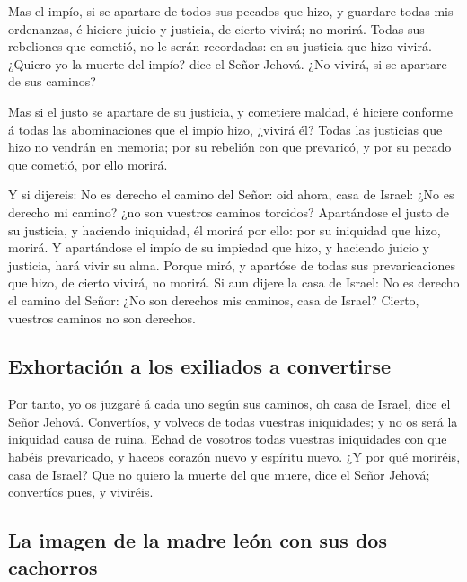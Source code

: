  Mas el impío, si se apartare de todos sus pecados que
hizo, y guardare todas mis ordenanzas, é hiciere juicio y justicia, de
cierto vivirá; no morirá.  Todas sus rebeliones que
cometió, no le serán recordadas: en su justicia que hizo vivirá.
 ¿Quiero yo la muerte del impío? dice el Señor Jehová. ¿No
vivirá, si se apartare de sus caminos?

 Mas si el justo se apartare de su justicia, y cometiere
maldad, é hiciere conforme á todas las abominaciones que el impío hizo,
¿vivirá él? Todas las justicias que hizo no vendrán en memoria; por su
rebelión con que prevaricó, y por su pecado que cometió, por ello
morirá.

 Y si dijereis: No es derecho el camino del Señor: oid
ahora, casa de Israel: ¿No es derecho mi camino? ¿no son vuestros
caminos torcidos?  Apartándose el justo de su justicia, y
haciendo iniquidad, él morirá por ello: por su iniquidad que hizo,
morirá.  Y apartándose el impío de su impiedad que hizo, y
haciendo juicio y justicia, hará vivir su alma.  Porque
miró, y apartóse de todas sus prevaricaciones que hizo, de cierto
vivirá, no morirá.  Si aun dijere la casa de Israel: No es
derecho el camino del Señor: ¿No son derechos mis caminos, casa de
Israel? Cierto, vuestros caminos no son derechos.

\hypertarget{exhortaciuxf3n-a-los-exiliados-a-convertirse}{%
\subsection{Exhortación a los exiliados a
convertirse}\label{exhortaciuxf3n-a-los-exiliados-a-convertirse}}

 Por tanto, yo os juzgaré á cada uno según sus caminos, oh
casa de Israel, dice el Señor Jehová. Convertíos, y volveos de todas
vuestras iniquidades; y no os será la iniquidad causa de ruina.
 Echad de vosotros todas vuestras iniquidades con que
habéis prevaricado, y haceos corazón nuevo y espíritu nuevo. ¿Y por qué
moriréis, casa de Israel?  Que no quiero la muerte del que
muere, dice el Señor Jehová; convertíos pues, y viviréis.

\hypertarget{la-imagen-de-la-madre-leuxf3n-con-sus-dos-cachorros}{%
\subsection{La imagen de la madre león con sus dos
cachorros}\label{la-imagen-de-la-madre-leuxf3n-con-sus-dos-cachorros}}

